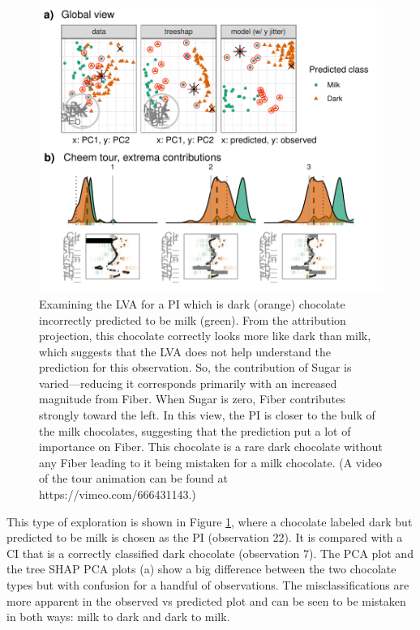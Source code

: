 \documentclass[
]{sn-jnl}
\begin{document}
\begin{CodeChunk}
\begin{figure}

{\centering \includegraphics[width=1\linewidth]{./figures/case_chocolates} 

}

\caption[Examining the LVA for a PI which is dark (orange) chocolate incorrectly predicted to be milk (green)]{Examining the LVA for a PI which is dark (orange) chocolate incorrectly predicted to be milk (green). From the attribution projection, this chocolate correctly looks more like dark than milk, which suggests that the LVA does not help understand the prediction for this observation. So, the contribution of Sugar is varied---reducing it corresponds primarily with an increased magnitude from Fiber. When Sugar is zero, Fiber contributes strongly toward the left. In this view, the PI is closer to the bulk of the milk chocolates, suggesting that the prediction put a lot of importance on Fiber. This chocolate is a rare dark chocolate without any Fiber leading to it being mistaken for a milk chocolate. (A video of the tour animation can be found at https://vimeo.com/666431143.)}\label{fig:casechocolates}
\end{figure}
\end{CodeChunk}

This type of exploration is shown in Figure \ref{fig:casechocolates},
where a chocolate labeled dark but predicted to be milk is chosen as the
PI (observation 22). It is compared with a CI that is a correctly
classified dark chocolate (observation 7). The PCA plot and the tree
SHAP PCA plots (a) show a big difference between the two chocolate types
but with confusion for a handful of observations. The misclassifications
are more apparent in the observed vs predicted plot and can be seen to
be mistaken in both ways: milk to dark and dark to milk.
\end{document}
